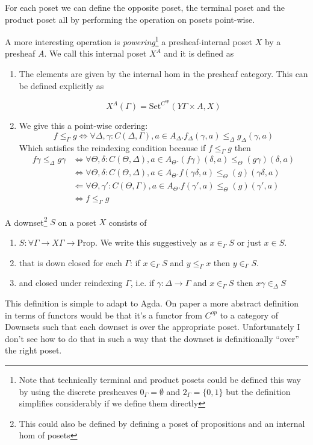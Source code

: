 \documentclass{article}
\newcommand{\Set}{\textrm{Set}}
\newcommand{\Prop}{\textrm{Prop}}
\begin{document}
For each poset we can define the opposite poset, the terminal poset
and the product poset all by performing the operation on posets
point-wise.

A more interesting operation is \emph{powering}\footnote{Note that
technically terminal and product posets could be defined this way by
using the discrete presheaves $0_\Gamma = \emptyset$ and $2_\Gamma =
\{ 0,1\}$ but the definition simplifies considerably if we define them
directly} a presheaf-internal poset $X$ by a presheaf $A$. We call
this internal poset $X^A$ and it is defined as
\begin{enumerate}
\item The elements are given by the internal hom in the presheaf
  category. This can be defined explicitly as

  \[ X^A(\Gamma) = \Set^{C^{op}}(Y\Gamma \times A, X) \]
\item We give this a point-wise ordering:
  \[ f \leq_{\Gamma} g \iff \forall \Delta, \gamma : C(\Delta,\Gamma), a \in A_\Delta.
  f_\Delta(\gamma,a) \leq_{\Delta} g_\Delta(\gamma,a)
  \]
  Which satisfies the reindexing condition because if $f\leq_\Gamma g$ then
  \begin{align*}
    f \gamma \leq_{\Delta} g\gamma
    &\iff \forall \Theta, \delta : C(\Theta,\Delta), a \in A_\Theta.
    (f\gamma)(\delta, a) \leq_\Theta (g\gamma)(\delta,a)\\
    &\iff \forall \Theta, \delta : C(\Theta,\Delta), a \in A_\Theta.
    f(\gamma\delta, a) \leq_\Theta (g)(\gamma\delta,a)\\
    &\Leftarrow \forall \Theta, \gamma' : C(\Theta,\Gamma), a \in A_\Theta.
    f(\gamma', a) \leq_\Theta (g)(\gamma',a)\\
    &\iff f\leq_\Gamma g
  \end{align*}
\end{enumerate}

A downset\footnote{This could also be defined by defining a poset of propositions and an internal hom of posets} $S$ on a poset $X$ consists of
\begin{enumerate}
\item $S : \forall \Gamma \to X \Gamma \to \Prop$. We write this
  suggestively as $x \in_{\Gamma} S$ or just $x \in S$.
\item that is down closed for each $\Gamma$: if $x \in_\Gamma S$ and
  $y \leq_\Gamma x$ then $y \in_\Gamma S$.
\item and closed under reindexing $\Gamma$, i.e. if $\gamma : \Delta
  \to \Gamma$ and $x \in_\Gamma S$ then $x\gamma \in_\Delta S$
\end{enumerate}
This definition is simple to adapt to Agda. On paper a more abstract
definition in terms of functors would be that it's a functor from
$C^{op}$ to a category of Downsets such that each downset is over the
appropriate poset. Unfortunately I don't see how to do that in such a
way that the downset is definitionally ``over'' the right poset.
\end{document}
